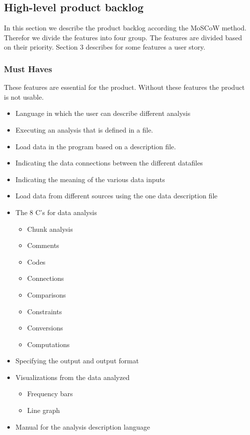 \subsection{High-level product backlog}
In this section we describe the product backlog according the MoSCoW method. Therefor we divide the features into four group. The features are divided based on their priority. Section 3 describes for some features a user story.
\subsubsection{Must Haves}
These features are essential for the product. Without these features the product is not usable.
\begin{itemize}
  \item Language in which the user can describe different analysis
  \item Executing an analysis that is defined in a file.
  \item Load data in the program based on a description file.
  \item Indicating the data connections between the different datafiles
  \item Indicating the meaning of the various data inputs
  \item Load data from different sources using the one data description file
  \item The 8 C's for data analysis
  \begin{itemize}
    \item Chunk analysis
    \item Comments
    \item Codes 
    \item Connections
    \item Comparisons
    \item Constraints
    \item Conversions
    \item Computations
  \end{itemize}
  \item Specifying the output and output format
  \item Visualizations from the data analyzed 
  \begin{itemize}
  	\item Frequency bars
    \item Line graph
  \end{itemize}
  \item Manual for the analysis description language
\end{itemize}

